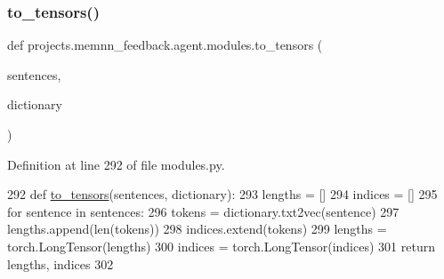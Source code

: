 \subsubsection{\texorpdfstring{to\+\_\+tensors()}{to\_tensors()}}
{\footnotesize\ttfamily def projects.\+memnn\+\_\+feedback.\+agent.\+modules.\+to\+\_\+tensors (\begin{DoxyParamCaption}\item[{}]{sentences,  }\item[{}]{dictionary }\end{DoxyParamCaption})}



Definition at line 292 of file modules.\+py.


\begin{DoxyCode}
292 \textcolor{keyword}{def }\hyperlink{namespaceprojects_1_1memnn__feedback_1_1agent_1_1modules_aa0f3493dccc8a3c07b66c48378f14003}{to\_tensors}(sentences, dictionary):
293     lengths = []
294     indices = []
295     \textcolor{keywordflow}{for} sentence \textcolor{keywordflow}{in} sentences:
296         tokens = dictionary.txt2vec(sentence)
297         lengths.append(len(tokens))
298         indices.extend(tokens)
299     lengths = torch.LongTensor(lengths)
300     indices = torch.LongTensor(indices)
301     \textcolor{keywordflow}{return} lengths, indices
302 \end{DoxyCode}
